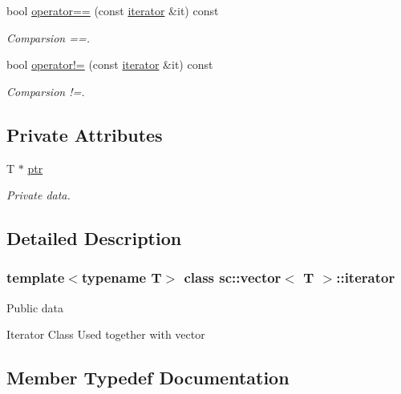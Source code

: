 \begin{DoxyCompactItemize}
bool \hyperlink{classsc_1_1vector_1_1iterator_ab635a96af6c0bcc3fe888e2568287df1}{operator==} (const \hyperlink{classsc_1_1vector_1_1iterator}{iterator} \&it) const
\begin{DoxyCompactList}\small\item\em Comparsion ==. \end{DoxyCompactList}\item 
bool \hyperlink{classsc_1_1vector_1_1iterator_ae0f420848b61b2f1bd5c7dc414082d29}{operator!=} (const \hyperlink{classsc_1_1vector_1_1iterator}{iterator} \&it) const
\begin{DoxyCompactList}\small\item\em Comparsion !=. \end{DoxyCompactList}\end{DoxyCompactItemize}
\subsection*{Private Attributes}
\begin{DoxyCompactItemize}
\item 
T $\ast$ \hyperlink{classsc_1_1vector_1_1iterator_a8f6a0c77f66fe2331b1837b341c08dc5}{ptr}
\begin{DoxyCompactList}\small\item\em Private data. \end{DoxyCompactList}\end{DoxyCompactItemize}


\subsection{Detailed Description}
\subsubsection*{template$<$typename T$>$\newline
class sc\+::vector$<$ T $>$\+::iterator}

Public data

Iterator Class Used together with vector 

\subsection{Member Typedef Documentation}
\mbox{\label{classsc_1_1vector_1_1iterator_a7089358e9f654206713ecd3951ac3545}} 
